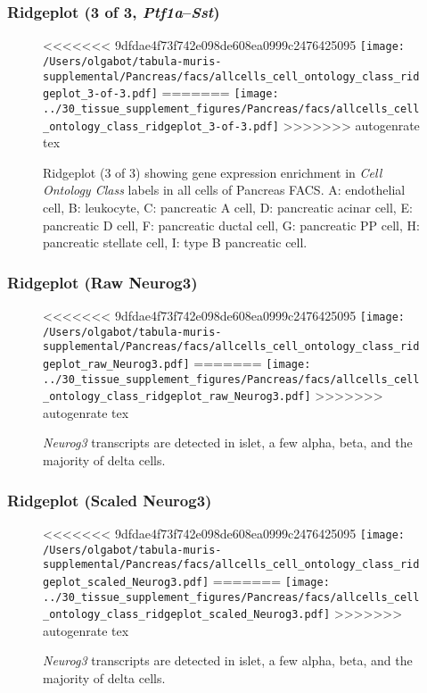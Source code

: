 \subsubsection{Ridgeplot (3 of 3, \emph{Ptf1a}--\emph{Sst})}
\begin{figure}[h]
\centering
<<<<<<< 9dfdae4f73f742e098de608ea0999c2476425095
\texttt{[image: /Users/olgabot/tabula-muris-supplemental/Pancreas/facs/allcells\_cell\_ontology\_class\_ridgeplot\_3-of-3.pdf]}
=======
\texttt{[image: ../30\_tissue\_supplement\_figures/Pancreas/facs/allcells\_cell\_ontology\_class\_ridgeplot\_3-of-3.pdf]}
>>>>>>> autogenrate tex

\caption{ Ridgeplot (3 of 3)  showing gene expression enrichment in \emph{Cell Ontology Class} labels in all cells of Pancreas FACS. A: endothelial cell, B: leukocyte, C: pancreatic A cell, D: pancreatic acinar cell, E: pancreatic D cell, F: pancreatic ductal cell, G: pancreatic PP cell, H: pancreatic stellate cell, I: type B pancreatic cell.}
\end{figure}


\clearpage

\subsubsection{Ridgeplot (Raw Neurog3)}
\begin{figure}[h]
\centering
<<<<<<< 9dfdae4f73f742e098de608ea0999c2476425095
\texttt{[image: /Users/olgabot/tabula-muris-supplemental/Pancreas/facs/allcells\_cell\_ontology\_class\_ridgeplot\_raw\_Neurog3.pdf]}
=======
\texttt{[image: ../30\_tissue\_supplement\_figures/Pancreas/facs/allcells\_cell\_ontology\_class\_ridgeplot\_raw\_Neurog3.pdf]}
>>>>>>> autogenrate tex

\caption{\emph{Neurog3} transcripts are detected in islet, a few alpha, beta, and the majority of delta cells.
}
\end{figure}


\clearpage

\subsubsection{Ridgeplot (Scaled Neurog3)}
\begin{figure}[h]
\centering
<<<<<<< 9dfdae4f73f742e098de608ea0999c2476425095
\texttt{[image: /Users/olgabot/tabula-muris-supplemental/Pancreas/facs/allcells\_cell\_ontology\_class\_ridgeplot\_scaled\_Neurog3.pdf]}
=======
\texttt{[image: ../30\_tissue\_supplement\_figures/Pancreas/facs/allcells\_cell\_ontology\_class\_ridgeplot\_scaled\_Neurog3.pdf]}
>>>>>>> autogenrate tex

\caption{\emph{Neurog3} transcripts are detected in islet, a few alpha, beta, and the majority of delta cells.
}
\end{figure}



